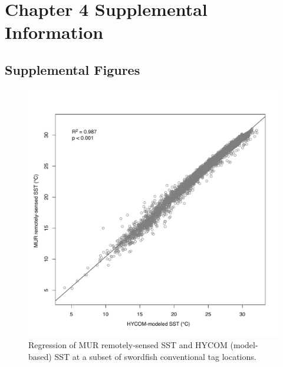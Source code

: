 \chapter{Chapter 4 Supplemental Information}
\label{sec:app4}
\raggedbottom

\clearpage

\section{Supplemental Figures}


\begin{figure}[htbp]
\centering
\includegraphics[width=\textwidth]{images/A4_FigS1.pdf}
\caption[Regression of remotely-sensed SST
and model-based SST at a subset of swordfish conventional tag
locations]{Regression of MUR remotely-sensed SST
and HYCOM (model-based) SST at a subset of swordfish conventional tag
locations.}
\label{fig:a4f1}
\end{figure}

